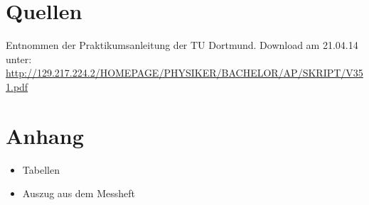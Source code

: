 \documentclass[11pt,ngerman,a4paper]{article}
\begin{document}
\section{Quellen}
\begin{enumerate}[{[}1{]}]
\item Entnommen der Praktikumsanleitung \textit{} der TU Dortmund. Download am 21.04.14 unter:\\
 \url{http://129.217.224.2/HOMEPAGE/PHYSIKER/BACHELOR/AP/SKRIPT/V351.pdf}
\end{enumerate}

\section{Anhang}
\begin{itemize}
\item Tabellen
\item Auszug aus dem Messheft
\end{itemize}
\end{document}

